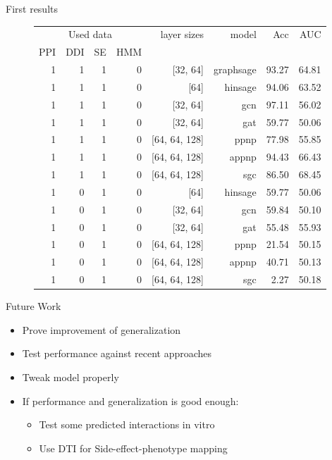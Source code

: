 \documentclass[10pt]{beamer}
\begin{document}
\begin{frame}{First results}
	\begin{figure}
		\centering
		\begingroup
		
		\footnotesize
		\def\arraystretch{1.2}
		\begin{tabular}{|r|r|r|r|r|r|r|r|}
			\hline
			\multicolumn{4}{|c|}{Used data}&layer sizes&model&Acc&AUC\\
			PPI&DDI&SE&HMM&&&&\\
			\hline
			1&1&1&0&[32, 64]&graphsage&93.27&64.81\\
			1&1&1&0&[64]&hinsage&94.06&63.52\\
			1&1&1&0&[32, 64]&gcn&97.11&56.02\\
			1&1&1&0&[32, 64]&gat&59.77&50.06\\
			1&1&1&0&[64, 64, 128]&ppnp&77.98&55.85\\
			1&1&1&0&[64, 64, 128]&appnp&94.43&66.43\\
			1&1&1&0&[64, 64, 128]&sgc&86.50&68.45\\
			1&0&1&0&[64]&hinsage&59.77&50.06\\
			1&0&1&0&[32, 64]&gcn&59.84&50.10\\
			1&0&1&0&[32, 64]&gat&55.48&55.93\\
			1&0&1&0&[64, 64, 128]&ppnp&21.54&50.15\\
			1&0&1&0&[64, 64, 128]&appnp&40.71&50.13\\
			1&0&1&0&[64, 64, 128]&sgc&2.27&50.18\\
			
			\hline  
		\end{tabular}
		\endgroup
	\end{figure}
\end{frame}

\begin{frame}{Future Work}
	\begin{itemize}
		\item Prove improvement of generalization
		\item Test performance against recent approaches
		\item Tweak model properly
		\item If performance and generalization is good enough:
		\begin{itemize}
			\item Test some predicted interactions in vitro
			\item Use DTI for Side-effect-phenotype mapping
		\end{itemize}
	\end{itemize}
\end{frame}
\end{document}
